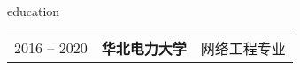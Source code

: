 
\begin{rubric}{education}
	\begin{tabular}{@{}p{3cm}p{4cm}p{6cm}@{}}
		2016 -- 2020 & \textbf{华北电力大学} & 网络工程专业
	\end{tabular}
\end{rubric}